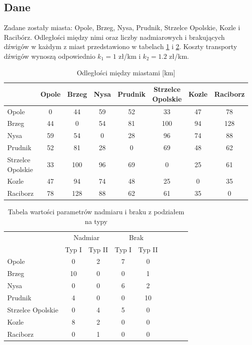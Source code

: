 \documentclass{article}
\begin{document}
\subsection{Dane}
Zadane zostały miasta: Opole, Brzeg, Nysa, Prudnik, Strzelce Opolskie, Kozle i Racibórz. 
Odległości między nimi oraz liczby nadmiarowych i brakujących dźwigów w każdym z miast przedstawiono w tabelach \ref{tab:odleglosci} i \ref{tab:nadmiar_brak_typy}.
Koszty transporty dźwigów wynoszą odpowiednio $k_1 = 1$ zł/km i $k_2 = 1.2$ zł/km.
\begin{table}[h]
    \centering
    \begin{tabular}{l|ccccccc}
        & Opole & Brzeg & Nysa & Prudnik & Strzelce Opolskie & Kozle & Raciborz \\
        \hline
        Opole & 0 & 44 & 59 & 52 & 33 & 47 & 78 \\
        Brzeg & 44 & 0 & 54 & 81 & 100 & 94 & 128 \\
        Nysa & 59 & 54 & 0 & 28 & 96 & 74 & 88 \\
        Prudnik & 52 & 81 & 28 & 0 & 69 & 48 & 62 \\
        Strzelce Opolskie & 33 & 100 & 96 & 69 & 0 & 25 & 61 \\
        Kozle & 47 & 94 & 74 & 48 & 25 & 0 & 35 \\
        Raciborz & 78 & 128 & 88 & 62 & 61 & 35 & 0 \\
    \end{tabular}
    \caption{Odległości między miastami [km]}
    \label{tab:odleglosci}
\end{table}

\begin{table}[h]
    \centering
    \begin{tabular}{l|cccccccc}
        & \multicolumn{2}{c}{Nadmiar} & \multicolumn{2}{c}{Brak} \\
        & \multicolumn{1}{c}{Typ I} & \multicolumn{1}{c}{Typ II} & \multicolumn{1}{c}{Typ I} & \multicolumn{1}{c}{Typ II} \\
        \hline
        Opole & 0 & 2 & 7 & 0 \\
        Brzeg & 10 & 0 & 0 & 1 \\
        Nysa & 0 & 0 & 6 & 2 \\
        Prudnik & 4 & 0 & 0 & 10 \\
        Strzelce Opolskie & 0 & 4 & 5 & 0 \\
        Kozle & 8 & 2 & 0 & 0 \\
        Raciborz & 0 & 1 & 0 & 0\\
    \end{tabular}
    \caption{Tabela wartości parametrów nadmiaru i braku z podziałem na typy}
    \label{tab:nadmiar_brak_typy}
\end{table}
\end{document}
